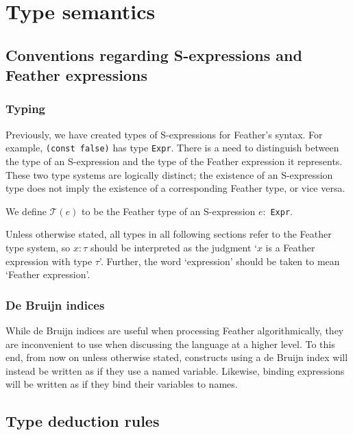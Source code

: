 \documentclass[UKenglish, 11pt, a4paper, parskip=half]{scrbook}
\newcommand{\inlinecode}[1]{\lstinline{#1}}
\begin{document}
\chapter{Type semantics}

\section{Conventions regarding S-expressions and Feather expressions}

\subsection{Typing}

Previously, we have created types of S-expressions for Feather's syntax.
For example, \inlinecode{(const false)} has type \inlinecode{Expr}.
There is a need to distinguish between the type of an S-expression and the type of the Feather expression it represents.
These two type systems are logically distinct; the existence of an S-expression type does not imply the existence of a corresponding Feather type, or vice versa.

We define \( \mathcal T(e) \) to be the Feather type of an S-expression \( e : \) \inlinecode{Expr}.

Unless otherwise stated, all types in all following sections refer to the Feather type system, so \( x : \tau \) should be interpreted as the judgment `\( x \) is a Feather expression with type \( \tau \)'.
Further, the word `expression' should be taken to mean `Feather expression'.

\subsection{De Bruijn indices}

While de Bruijn indices are useful when processing Feather algorithmically, they are inconvenient to use when discussing the language at a higher level.
To this end, from now on unless otherwise stated, constructs using a de Bruijn index will instead be written as if they use a named variable.
Likewise, binding expressions will be written as if they bind their variables to names.

\section{Type deduction rules}

\end{document}
